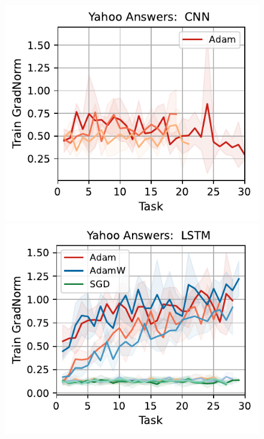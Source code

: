 \begin{figure}[htb!]
{    \includegraphics[width=\textwidth]{figs/GradNorm/nlp/cnn/yahoo_answers_50.pdf}
    \includegraphics[width=\textwidth]{figs/GradNorm/nlp/lstm/yahoo_answers_50.pdf}
}
\end{figure}

